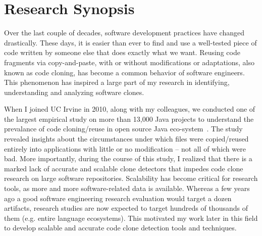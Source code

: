 \documentclass[a4paper]{article}
\begin{document}

\section*{Research Synopsis}


Over the last couple of decades, software development
practices have changed drastically. 
These days, it is easier than ever to find and 
use a well-tested piece of code written by someone else that
does exactly what we want. Reusing code
fragments via copy-and-paste, with or without modifications
or adaptations, also known as code cloning, has become a common behavior of software engineers. This phenomenon has inspired a large part of my research in identifying, understanding and analyzing software clones. 


When I joined UC Irvine in 2010, along with my colleagues, we conducted  one of the largest empirical study
on more than 13,000 Java projects to understand the prevalance of code cloning/reuse in open source Java eco-system~\cite{filecloning}.
The study revealed insights about the circumstances under which files were copied/reused entirely into applications with little or no modification -- not all of which were bad. 
More importantly, during the course of this study, I realized that there is a marked lack of accurate and scalable clone detectors that impedes code clone research on large software repositories. 
Scalability has become critical for research tools, as more and more software-related data is available. Whereas a few years ago a good software engineering research evaluation would target a dozen artifacts, research studies are now expected to target hundreds of thousands of them (e.g. entire language ecosystems). This motivated my work later in this field to develop scalable and accurate code clone detection tools and techniques.  
\end{document}
